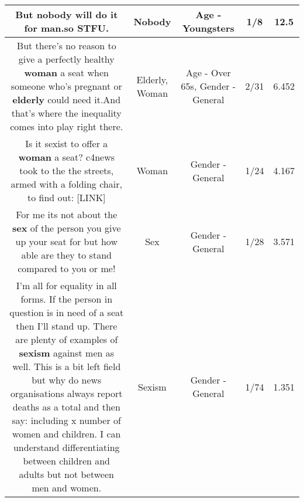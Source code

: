 \documentclass[11pt]{article}
\newlength\mylength
\begin{document}
\begin{center}
\begin{longtable}{|C{.65\mylength}|C{.30\mylength}|C{.12\mylength}|C{.12\mylength}|C{.12\mylength}|}
  \small But \textbf{nobody} will do it for man.so STFU.\normalsize   & Nobody & Age - Youngsters & 1/8 & 12.5 \\  \hline
  \small But there's no reason to give a perfectly healthy \textbf{woman} a seat when someone who's pregnant or \textbf{elderly} could need it.And that's where the inequality comes into play right there.\normalsize   & Elderly, Woman & Age - Over 65s, Gender - General & 2/31 & 6.452 \\  \hline
  \small Is it sexist to offer a \textbf{woman} a seat? c4news took to the the streets, armed with a folding chair, to find out:  [LINK] \normalsize   & Woman & Gender - General & 1/24 & 4.167 \\  \hline
  \small For me its not about the \textbf{sex} of the person you give up your seat for but how able are they to stand compared to you or me!\normalsize   & Sex & Gender - General & 1/28 & 3.571 \\  \hline
  \small I'm all for equality in all forms. If the person in question is in need of a seat then I'll stand up. There are plenty of examples of \textbf{sexism} against men as well. This is a bit left field but why do news organisations always report deaths as a total and then say: including x number of women and children. I can understand differentiating between children and adults but not between men and women.\normalsize   & Sexism & Gender - General & 1/74 & 1.351 \\  \hline

\end{longtable}
\end{center}
\end{document}
